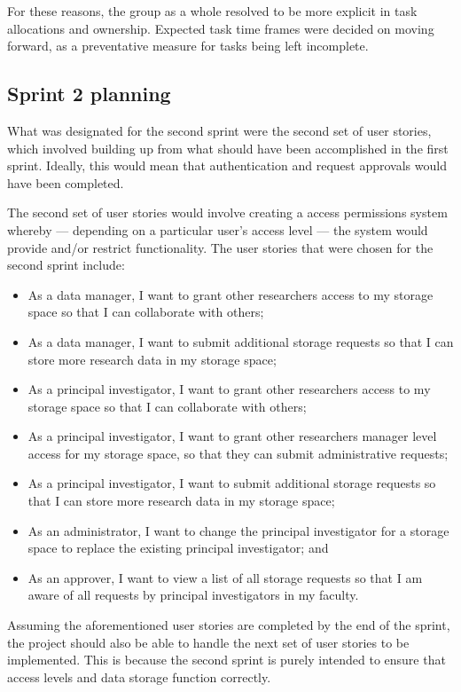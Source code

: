 \documentclass[a4paper,titlepage,12pt]{article}
\begin{document}
For these reasons, the group as a whole resolved to be more explicit in task
allocations and ownership. Expected task time frames were decided on moving
forward, as a preventative measure for tasks being left incomplete.

\subsection{Sprint 2 planning}

What was designated for the second sprint were the second set of user stories,
which involved building up from what should have been accomplished in the first
sprint. Ideally, this would mean that authentication and request approvals
would have been completed.

The second set of user stories would involve creating a access permissions
system whereby --- depending on a particular user's access level --- the system
would provide and/or restrict functionality. The user stories that were chosen
for the second sprint include:

\begin{itemize}
	\item As a data manager, I want to grant other researchers access to my
	      storage space so that I can collaborate with others;
	\item As a data manager, I want to submit additional storage requests
	      so that I can store more research data in my storage space;
	\item As a principal investigator, I want to grant other researchers
	      access to my storage space so that I can collaborate with others;
	\item As a principal investigator, I want to grant other researchers
	      manager level access for my storage space, so that they can
	      submit administrative requests;
	\item As a principal investigator, I want to submit additional storage
	      requests so that I can store more research data in my storage
	      space;
	\item As an administrator, I want to change the principal investigator
	      for a storage space to replace the existing principal
	      investigator; and
	\item As an approver, I want to view a list of all storage requests so
	      that I am aware of all requests by principal investigators in my
	      faculty.
\end{itemize}

Assuming the aforementioned user stories are completed by the end of the
sprint, the project should also be able to handle the next set of user stories
to be implemented. This is because the second sprint is purely intended to
ensure that access levels and data storage function correctly.
\end{document}
